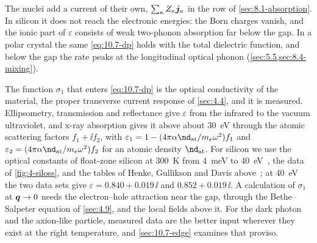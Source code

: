 The nuclei add a current of their own, $\sum_\kappa Z_\kappa\bm{j}_\kappa$ in the row of \cref{sec:8.1-absorption}. In silicon it does not reach the electronic energies: the Born charges vanish, and the ionic part of $\varepsilon$ consists of weak two-phonon absorption far below the gap. In a polar crystal the same \cref{eq:10.7-dp} holds with the total dielectric function, and below the gap the rate peaks at the longitudinal optical phonon (\cref{sec:5.5,sec:8.4-mixing}).

The function $\sigma_1$ that enters \cref{eq:10.7-dp} is the optical conductivity of the material, the proper transverse current response of \cref{sec:4.4}, and it is measured. Ellipsometry, transmission and reflectance give $\varepsilon$ from the infrared to the vacuum ultraviolet, and x-ray absorption gives it above about \SI{30}{eV} through the atomic scattering factors $f_1 + \ii f_2$, with $\varepsilon_1 = 1 - (4\pi\alpha\nd_{\mathrm{at}}/m_e\omega^2)f_1$ and $\varepsilon_2 = (4\pi\alpha\nd_{\mathrm{at}}/m_e\omega^2)f_2$ for an atomic density $\nd_{\mathrm{at}}$. For silicon we use the optical constants of float-zone silicon at \SI{300}{K} from \SI{4}{meV} to \SI{40}{eV}~\cite{franta2017temperature}, the data of \cref{fig:4-siloss}, and the tables of Henke, Gullikson and Davis above~\cite{henke1993xray}; at \SI{40}{eV} the two data sets give $\varepsilon = 0.840 + 0.019\,\ii$ and $0.852 + 0.019\,\ii$. A calculation of $\sigma_1$ at $\bm{q} \to 0$ needs the electron--hole attraction near the gap, through the Bethe--Salpeter equation of \cref{sec:4.9}, and the local fields above it. For the dark photon and the axion-like particle, measured data are the better input wherever they exist at the right temperature, and \cref{sec:10.7-edge} examines that proviso.

